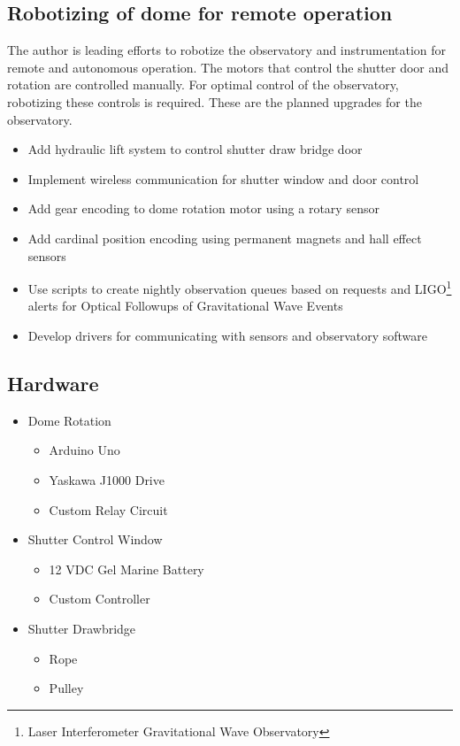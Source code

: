 \subsection{Robotizing of dome for remote operation}
The author is leading efforts to robotize the observatory and instrumentation for remote and autonomous operation.
The motors that control the shutter door and rotation are controlled manually.
For optimal control of the observatory, robotizing these controls is required.
These are the planned upgrades for the observatory.
\begin{itemize}
    \item Add hydraulic lift system to control shutter draw bridge door
    \item Implement wireless communication for shutter window and door control
    \item Add gear encoding to dome rotation motor using a rotary sensor
    \item Add cardinal position encoding using permanent magnets and hall effect sensors
    \item Use scripts to create nightly observation queues based on requests and LIGO\footnote{Laser Interferometer Gravitational Wave Observatory} alerts for Optical Followups of Gravitational Wave Events
    \item Develop drivers for communicating with sensors and observatory software
\end{itemize}

\subsection{Hardware}
\begin{itemize}
    \item Dome Rotation
        \begin{itemize}
            \item Arduino Uno  
            \item Yaskawa J1000 Drive
            \item Custom Relay Circuit
        \end{itemize}
    \item Shutter Control Window
        \begin{itemize}
            \item 12 VDC Gel Marine Battery
            \item Custom Controller
        \end{itemize}
    \item Shutter Drawbridge
        \begin{itemize}
            \item Rope
            \item Pulley
        \end{itemize}
\end{itemize}
    

